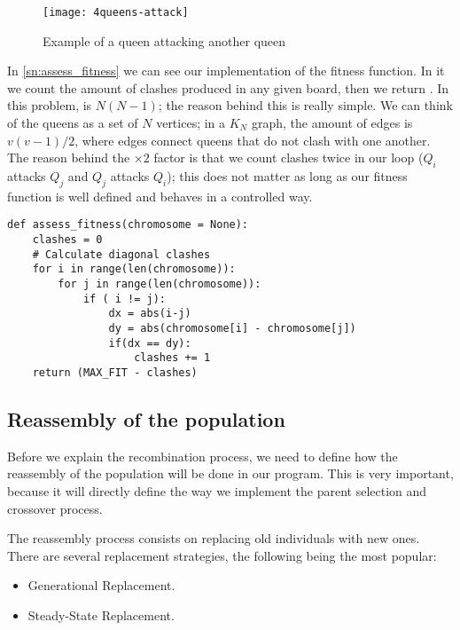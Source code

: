 \begin{figure}[H]
	\centering
	\texttt{[image: 4queens-attack]}
	\caption{Example of a queen attacking another queen}
	\label{fig:4queens-attack}
\end{figure}

In \cref{sn:assess_fitness} we can see our implementation of the fitness function. In it we count the amount of clashes produced in any given board, then we return . In this problem,  is $N (N-1)$; the reason behind this is really simple. We can think of the queens as a set of $N$ vertices; in a $K_{N}$ graph, the amount of edges is $v (v-1)/ 2$, where edges connect queens that do not clash with one another. The reason behind the $\times 2$ factor is that we count clashes twice in our loop ($Q_{i}$ attacks $Q_{j}$ and $Q_{j}$ attacks $Q_{i}$); this does not matter as long as our fitness function is well defined and behaves in a controlled way.

\begin{lstlisting}[label=sn:assess_fitness, caption=Fitness function]
def assess_fitness(chromosome = None):
	clashes = 0
	# Calculate diagonal clashes
	for i in range(len(chromosome)):
		for j in range(len(chromosome)):
			if ( i != j):
				dx = abs(i-j)
				dy = abs(chromosome[i] - chromosome[j])
				if(dx == dy):
					clashes += 1
	return (MAX_FIT - clashes)
\end{lstlisting}

\subsection{Reassembly of the population}\nocite{Zapfel2010}

Before we explain the recombination process, we need to define how the reassembly of the population will be done in our program. This is very important, because it will directly define the way we implement the parent selection and crossover process.

The reassembly process consists on replacing old individuals with new ones. There are several replacement strategies, the following being the most popular:
\begin{itemize}
	\item Generational Replacement.
	\item Steady-State Replacement.
\end{itemize}

